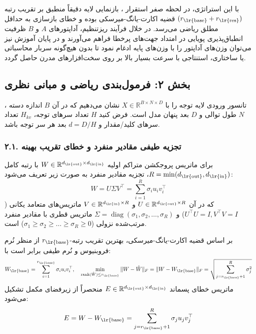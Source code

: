 با این استراتژی، در لحظه صفر استقرار ، بازنمایی لایه دقیقاً منطبق بر تقریب رتبه $(r_{\text{\lr{base}}} + r_{\text{\lr{res}}})$ قضیه اکارت-یانگ-میرسکی  بوده و خطای بازسازی به حداقل مطلق ریاضی می‌رسد. در خلال فرآیند ریزتنظیم، آداپتورهای $A$ و $B$ ظرفیت انطباق‌پذیری پویایی در امتداد جهت‌های پرخطا فراهم می‌آورند و در پایان آموزش نیز می‌توان وزن‌های آداپتور را با وزن‌های پایه ادغام نمود  تا بدون هیچ‌گونه سربار محاسباتی یا ساختاری، استنتاجی با سرعت بسیار بالا بر روی سخت‌افزارهای مدرن حاصل گردد.

\subsection*{بخش ۲: فرمول‌بندی ریاضی و مبانی نظری }
تانسور ورودی لایه توجه را با $X \in \mathbb{R}^{B \times N \times D}$ نشان می‌دهیم که در آن $B$ اندازه دسته ، $N$ طول توالی  و $D$ بعد پنهان مدل  است. فرض کنید $H$ تعداد سرهای توجه، $H_{kv}$ تعداد سرهای کلید/مقدار و $d = D/H$ بعد هر سر توجه باشد.

\subsubsection*{۲.۱. تجزیه طیفی مقادیر منفرد و خطای تقریب بهینه}
برای ماتریس پروجکشن متراکم اولیه $W \in \mathbb{R}^{d_{\text{\lr{out}}} \times d_{\text{\lr{in}}}}$ با رتبه کامل $R = \min(d_{\text{\lr{out}}}, d_{\text{\lr{in}}})$، تجزیه مقادیر منفرد به صورت زیر تعریف می‌شود:
\begin{equation}
W = U \Sigma V^\top = \sum_{i=1}^R \sigma_i u_i v_i^\top
\end{equation}
که در آن $U \in \mathbb{R}^{d_{\text{\lr{out}}} \times R}$ و $V \in \mathbb{R}^{d_{\text{\lr{in}}} \times R}$ ماتریس‌های متعامد یکانی ($U^\top U = I, V^\top V = I$) و $\Sigma = \operatorname{diag}(\sigma_1, \sigma_2, \dots, \sigma_R)$ ماتریس قطری با مقادیر منفرد مرتب‌شده نزولی ($\sigma_1 \ge \sigma_2 \ge \dots \ge \sigma_R \ge 0$) است.

بر اساس قضیه اکارت-یانگ-میرسکی، بهترین تقریب رتبه-$r_{\text{\lr{base}}}$ از منظر نُرم فروبنیوس و نُرم طیفی برابر است با:
\begin{equation}
W_{\text{\lr{base}}} = \sum_{i=1}^{r_{\text{\lr{base}}}} \sigma_i u_i v_i^\top, \quad \min_{\operatorname{rank}(\hat{W}) \le r_{\text{\lr{base}}}} \|W - \hat{W}\|_F = \|W - W_{\text{\lr{base}}}\|_F = \sqrt{\sum_{j=r_{\text{\lr{base}}}+1}^R \sigma_j^2}
\end{equation}
ماتریس خطای پسماند $E \in \mathbb{R}^{d_{\text{\lr{out}}} \times d_{\text{\lr{in}}}}$ منحصراً از زیرفضای مکمل تشکیل می‌شود:
\begin{equation}
E = W - W_{\text{\lr{base}}} = \sum_{j=r_{\text{\lr{base}}}+1}^R \sigma_j u_j v_j^\top
\end{equation}


